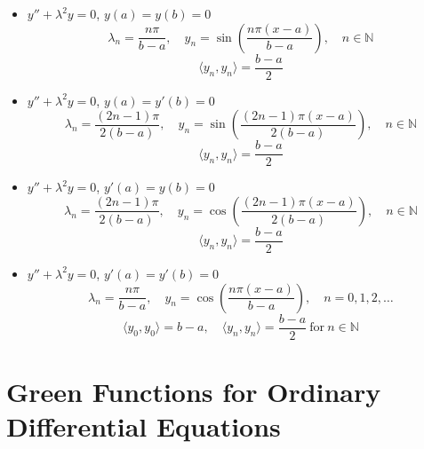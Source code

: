 \begin{itemize}
\item 
  $y'' + \lambda^2 y = 0$, $y(a) = y(b) = 0$
  \[
  \lambda_n = \frac{n \pi}{b-a}, \quad
  y_n = \sin \left( \frac{n \pi (x-a) }{ b-a } \right), \quad
  n \in \mathbb{N}
  \]
  \[
  \langle y_n, y_n \rangle = \frac{b-a}{2}
  \]
\item 
  $y'' + \lambda^2 y = 0$, $y(a) = y'(b) = 0$
  \[
  \lambda_n = \frac{(2n-1) \pi}{2(b-a)}, \quad
  y_n = \sin \left( \frac{(2n-1) \pi (x-a) }{ 2(b-a) } \right), \quad
  n \in \mathbb{N}
  \]
  \[
  \langle y_n, y_n \rangle = \frac{b-a}{2}
  \]
\item 
  $y'' + \lambda^2 y = 0$, $y'(a) = y(b) = 0$
  \[
  \lambda_n = \frac{(2n-1) \pi}{2(b-a)}, \quad
  y_n = \cos \left( \frac{(2n-1) \pi (x-a) }{ 2(b-a) } \right), \quad
  n \in \mathbb{N}
  \]
  \[
  \langle y_n, y_n \rangle = \frac{b-a}{2}
  \]
\item 
  $y'' + \lambda^2 y = 0$, $y'(a) = y'(b) = 0$
  \[
  \lambda_n = \frac{n \pi}{b-a}, \quad
  y_n = \cos \left( \frac{n \pi (x-a) }{ b-a } \right), \quad
  n = 0,1,2,\ldots
  \]
  \[
  \langle y_0, y_0 \rangle = b-a, \quad
  \langle y_n, y_n \rangle = \frac{b-a}{2}\ \mathrm{for}\ n \in \mathbb{N}
  \]
\end{itemize}


















\raggedbottom
\chapter{Green Functions for Ordinary Differential Equations}
\raggedbottom 




